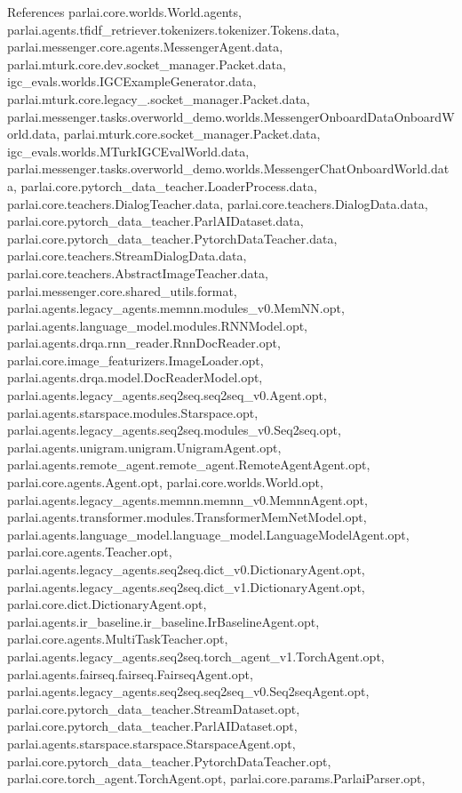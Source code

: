 References parlai.\+core.\+worlds.\+World.\+agents, parlai.\+agents.\+tfidf\+\_\+retriever.\+tokenizers.\+tokenizer.\+Tokens.\+data, parlai.\+messenger.\+core.\+agents.\+Messenger\+Agent.\+data, parlai.\+mturk.\+core.\+dev.\+socket\+\_\+manager.\+Packet.\+data, igc\+\_\+evals.\+worlds.\+I\+G\+C\+Example\+Generator.\+data, parlai.\+mturk.\+core.\+legacy\+\_.\+socket\+\_\+manager.\+Packet.\+data, parlai.\+messenger.\+tasks.\+overworld\+\_\+demo.\+worlds.\+Messenger\+Onboard\+Data\+Onboard\+World.\+data, parlai.\+mturk.\+core.\+socket\+\_\+manager.\+Packet.\+data, igc\+\_\+evals.\+worlds.\+M\+Turk\+I\+G\+C\+Eval\+World.\+data, parlai.\+messenger.\+tasks.\+overworld\+\_\+demo.\+worlds.\+Messenger\+Chat\+Onboard\+World.\+data, parlai.\+core.\+pytorch\+\_\+data\+\_\+teacher.\+Loader\+Process.\+data, parlai.\+core.\+teachers.\+Dialog\+Teacher.\+data, parlai.\+core.\+teachers.\+Dialog\+Data.\+data, parlai.\+core.\+pytorch\+\_\+data\+\_\+teacher.\+Parl\+A\+I\+Dataset.\+data, parlai.\+core.\+pytorch\+\_\+data\+\_\+teacher.\+Pytorch\+Data\+Teacher.\+data, parlai.\+core.\+teachers.\+Stream\+Dialog\+Data.\+data, parlai.\+core.\+teachers.\+Abstract\+Image\+Teacher.\+data, parlai.\+messenger.\+core.\+shared\+\_\+utils.\+format, parlai.\+agents.\+legacy\+\_\+agents.\+memnn.\+modules\+\_\+v0.\+Mem\+N\+N.\+opt, parlai.\+agents.\+language\+\_\+model.\+modules.\+R\+N\+N\+Model.\+opt, parlai.\+agents.\+drqa.\+rnn\+\_\+reader.\+Rnn\+Doc\+Reader.\+opt, parlai.\+core.\+image\+\_\+featurizers.\+Image\+Loader.\+opt, parlai.\+agents.\+drqa.\+model.\+Doc\+Reader\+Model.\+opt, parlai.\+agents.\+legacy\+\_\+agents.\+seq2seq.\+seq2seq\+\_\+v0.\+Agent.\+opt, parlai.\+agents.\+starspace.\+modules.\+Starspace.\+opt, parlai.\+agents.\+legacy\+\_\+agents.\+seq2seq.\+modules\+\_\+v0.\+Seq2seq.\+opt, parlai.\+agents.\+unigram.\+unigram.\+Unigram\+Agent.\+opt, parlai.\+agents.\+remote\+\_\+agent.\+remote\+\_\+agent.\+Remote\+Agent\+Agent.\+opt, parlai.\+core.\+agents.\+Agent.\+opt, parlai.\+core.\+worlds.\+World.\+opt, parlai.\+agents.\+legacy\+\_\+agents.\+memnn.\+memnn\+\_\+v0.\+Memnn\+Agent.\+opt, parlai.\+agents.\+transformer.\+modules.\+Transformer\+Mem\+Net\+Model.\+opt, parlai.\+agents.\+language\+\_\+model.\+language\+\_\+model.\+Language\+Model\+Agent.\+opt, parlai.\+core.\+agents.\+Teacher.\+opt, parlai.\+agents.\+legacy\+\_\+agents.\+seq2seq.\+dict\+\_\+v0.\+Dictionary\+Agent.\+opt, parlai.\+agents.\+legacy\+\_\+agents.\+seq2seq.\+dict\+\_\+v1.\+Dictionary\+Agent.\+opt, parlai.\+core.\+dict.\+Dictionary\+Agent.\+opt, parlai.\+agents.\+ir\+\_\+baseline.\+ir\+\_\+baseline.\+Ir\+Baseline\+Agent.\+opt, parlai.\+core.\+agents.\+Multi\+Task\+Teacher.\+opt, parlai.\+agents.\+legacy\+\_\+agents.\+seq2seq.\+torch\+\_\+agent\+\_\+v1.\+Torch\+Agent.\+opt, parlai.\+agents.\+fairseq.\+fairseq.\+Fairseq\+Agent.\+opt, parlai.\+agents.\+legacy\+\_\+agents.\+seq2seq.\+seq2seq\+\_\+v0.\+Seq2seq\+Agent.\+opt, parlai.\+core.\+pytorch\+\_\+data\+\_\+teacher.\+Stream\+Dataset.\+opt, parlai.\+core.\+pytorch\+\_\+data\+\_\+teacher.\+Parl\+A\+I\+Dataset.\+opt, parlai.\+agents.\+starspace.\+starspace.\+Starspace\+Agent.\+opt, parlai.\+core.\+pytorch\+\_\+data\+\_\+teacher.\+Pytorch\+Data\+Teacher.\+opt, parlai.\+core.\+torch\+\_\+agent.\+Torch\+Agent.\+opt, parlai.\+core.\+params.\+Parlai\+Parser.\+opt, 